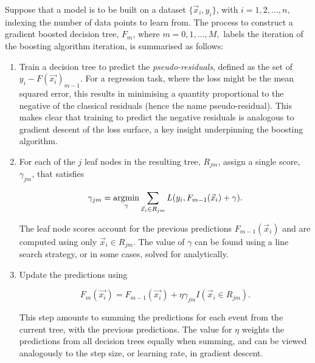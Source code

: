 Suppose that a model is to be built on a dataset $\{\vec{x}_{i},y_{i}\}$, with $i=1,2, ..., n,$ indexing the number of data points to learn from. The process to construct a gradient boosted decision tree, $F_{m}$, where $m=0,1, ..., M,$ labels the iteration of the boosting algorithm iteration, is summarised as follows: %

\begin{enumerate}
        
 
        \item  Train a decision tree to predict the \textit{pseudo-residuals}, defined as the set of $y_{i}-F(\vec{x_{i}})_{m-1}$. For a regression task, where the loss might be the mean squared error, this results in minimising a quantity proportional to the negative of the classical residuals (hence the name pseudo-residual). This makes clear that training to predict the negative residuals is analogous to gradient descent of the loss surface, a key insight underpinning the boosting algorithm. %
        
        \item For each of the $j$ leaf nodes in the resulting tree, $R_{jm}$, assign a single score, $\gamma_{jm}$, that satisfies
        
        \begin{equation}\label{eqn:hee_boosting_2B}
        \gamma_{jm} = \operatorname*{argmin}_{\gamma} \sum_{\vec{x}_{i}\in R_{jm}} L(y_{i}, F_{m-1}(\vec{x}_{i})+\gamma).
        \end{equation}
        
        
        \noindent The leaf node scores account for the previous predictions $F_{m-1}(\vec{x}_{i})$ and are computed using only $\vec{x}_{i}\in R_{jm}$. The value of $\gamma$ can be found using a line search strategy, or in some cases, solved for analytically. %
        
        \item Update the predictions using
        
        \begin{equation}
            F_{m}(\vec{x_{i}}) = F_{m-1}(\vec{x_{i}}) + \eta \gamma_{jm} I(\vec{x}_{i}\in R_{jm}).
        \end{equation} %
        
       \noindent This step amounts to summing the predictions for each event from the current tree, with the previous predictions. The value for $\eta$ weights the predictions from all decision trees equally when summing, and can be viewed analogously to the step size, or learning rate, in gradient descent. 


\end{enumerate}

